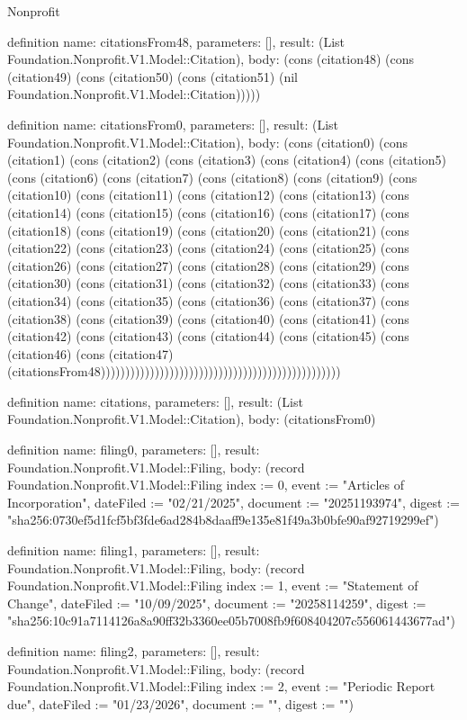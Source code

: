 \begin{lexlean}{Nonprofit}
\begin{semanticmodule}
definition{
  name: citationsFrom48,
  parameters: [],
  result: (List Foundation.Nonprofit.V1.Model::Citation),
  body: (cons (citation48) (cons (citation49) (cons (citation50) (cons (citation51) (nil Foundation.Nonprofit.V1.Model::Citation)))))
}

definition{
  name: citationsFrom0,
  parameters: [],
  result: (List Foundation.Nonprofit.V1.Model::Citation),
  body: (cons (citation0) (cons (citation1) (cons (citation2) (cons (citation3) (cons (citation4) (cons (citation5) (cons (citation6) (cons (citation7) (cons (citation8) (cons (citation9) (cons (citation10) (cons (citation11) (cons (citation12) (cons (citation13) (cons (citation14) (cons (citation15) (cons (citation16) (cons (citation17) (cons (citation18) (cons (citation19) (cons (citation20) (cons (citation21) (cons (citation22) (cons (citation23) (cons (citation24) (cons (citation25) (cons (citation26) (cons (citation27) (cons (citation28) (cons (citation29) (cons (citation30) (cons (citation31) (cons (citation32) (cons (citation33) (cons (citation34) (cons (citation35) (cons (citation36) (cons (citation37) (cons (citation38) (cons (citation39) (cons (citation40) (cons (citation41) (cons (citation42) (cons (citation43) (cons (citation44) (cons (citation45) (cons (citation46) (cons (citation47) (citationsFrom48)))))))))))))))))))))))))))))))))))))))))))))))))
}

definition{
  name: citations,
  parameters: [],
  result: (List Foundation.Nonprofit.V1.Model::Citation),
  body: (citationsFrom0)
}

definition{
  name: filing0,
  parameters: [],
  result: Foundation.Nonprofit.V1.Model::Filing,
  body: (record Foundation.Nonprofit.V1.Model::Filing {index := 0, event := "Articles of Incorporation", dateFiled := "02/21/2025", document := "20251193974", digest := "sha256:0730ef5d1fcf5bf3fde6ad284b8daaff9e135e81f49a3b0bfe90af92719299ef"})
}

definition{
  name: filing1,
  parameters: [],
  result: Foundation.Nonprofit.V1.Model::Filing,
  body: (record Foundation.Nonprofit.V1.Model::Filing {index := 1, event := "Statement of Change", dateFiled := "10/09/2025", document := "20258114259", digest := "sha256:10c91a7114126a8a90ff32b3360ee05b7008fb9f608404207c556061443677ad"})
}

definition{
  name: filing2,
  parameters: [],
  result: Foundation.Nonprofit.V1.Model::Filing,
  body: (record Foundation.Nonprofit.V1.Model::Filing {index := 2, event := "Periodic Report due", dateFiled := "01/23/2026", document := "", digest := ""})
}


\end{semanticmodule}
\end{lexlean}

